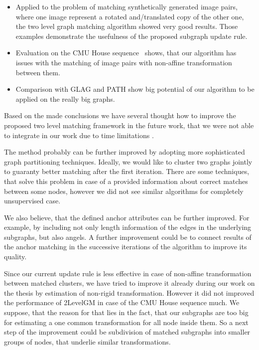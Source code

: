 \begin{itemize}
\item Applied to the problem of matching synthetically generated image pairs, where one image represent a rotated and/translated copy of the other one, the two level graph matching algorithm showed very good results.
Those examples demonstrate the usefulness of the proposed subgraph update rule.
\item Evaluation on the CMU House sequence~\cite{CMUHouse} shows, that our algorithm has issues with the matching of image pairs with non-affine transformation between them.
\item Comparison with GLAG and PATH show big potential of our algorithm to be applied on the really big graphs.
\end{itemize}

Based on the made conclusions we have several thought how to improve the proposed two level matching framework in the future work, that we were not able to integrate in our work due to time limitations .

The method probably can be further improved by adopting more sophisticated graph partitioning techniques. Ideally, we would like to cluster two graphs jointly to guaranty better matching after the first iteration. There are some techniques, that solve this problem in case of a provided information about correct matches between some nodes, however we did not see similar algorithms for completely unsupervised case.

We also believe, that the defined anchor attributes can be further improved. For example, by including not only length information of the edges in the underlying subgraphs, but also angels. A further improvement could be to connect results of the anchor matching in the successive iterations of the algorithm to improve its quality.

Since our current update rule is less effective in case of non-affine transformation between matched clusters, we have tried to improve it already during our work on the thesis by estimation of non-rigid transformation. However it did not improved the performance of 2LevelGM in case of the CMU House sequence much. We suppose, that the reason for that lies in the fact, that our subgraphs are too big for estimating a one common transformation for all node inside them. So a next step of the improvement could be subdivision of matched subgraphs into smaller groups of nodes, that underlie similar transformations.

